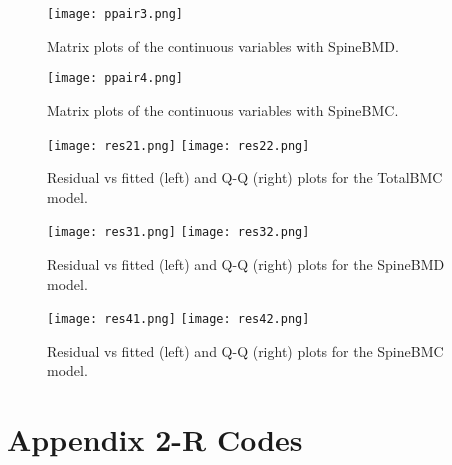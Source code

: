 \documentclass[11pt]{article}
\begin{document}
            \begin{figure}[!htbp]
            \centering
            \texttt{[image: ppair3.png]}
            \caption{Matrix plots of the continuous variables with SpineBMD.}
            \label{fig:method}
            \end{figure}

            \begin{figure}[!htbp]
            \centering
            \texttt{[image: ppair4.png]}
            \caption{Matrix plots of the continuous variables with SpineBMC.}
            \label{fig:method}
            \end{figure}
            
            \begin{figure}[!htbp]
            \centering
            \texttt{[image: res21.png]} \texttt{[image: res22.png]}
            \caption{Residual vs fitted (left) and Q-Q (right) plots for the TotalBMC model.}
            \label{fig:method}
            \end{figure}

            \begin{figure}[!htbp]
            \centering
            \texttt{[image: res31.png]} \texttt{[image: res32.png]}
            \caption{Residual vs fitted (left) and Q-Q (right) plots for the SpineBMD model.}
            \label{fig:method}
            \end{figure}

            \begin{figure}[!htbp]
            \centering
            \texttt{[image: res41.png]} \texttt{[image: res42.png]}
            \caption{Residual vs fitted (left) and Q-Q (right) plots for the SpineBMC model.}
            \label{fig:method}
            \end{figure}

            

\newpage 

\section*{Appendix 2-R Codes}
\end{document}
